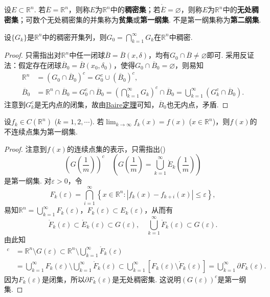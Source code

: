 \documentclass[../../main.tex]{subfiles}
\begin{document}
\begin{definition}
设$E\subset\mathbb{R}^n$. 若$\overline{E}=\mathbb{R}^n$，则称$E$为$\mathbb{R}^n$中的\textbf{稠密集}；若$\mathring{\overline{E}}=\varnothing$，则称$E$为$\mathbb{R}^n$中的\textbf{无处稠密集}；可数个无处稠密集的并集称为\textbf{贫集}或\textbf{第一纲集}. 不是第一纲集称为\textbf{第二纲集}.
\end{definition}

\begin{example}\label{example:例14}
设$\{G_k\}$是$\mathbb{R}^n$中的稠密开集列，则$G_0 = \bigcap_{k = 1}^{\infty}G_k$在$\mathbb{R}^n$中稠密.
\end{example}
\begin{proof}
只需指出对$\mathbb{R}^n$中任一闭球$\overline{B}=\overline{B}(x,\delta)$，均有$G_0\cap\overline{B}\neq\varnothing$即可. 采用反证法：假定存在闭球$\overline{B}_0=\overline{B}(x_0,\delta_0)$，使得$G_0\cap\overline{B}_0=\varnothing$，则易知
\begin{align*}
\mathbb{R}^n&=(G_0\cap\overline{B}_0)^c = G_0^c\cup(\overline{B}_0)^c,\\
\overline{B}_0&=\mathbb{R}^n\cap\overline{B}_0 = G_0^c\cap\overline{B}_0=\left(\bigcap_{k = 1}^{\infty}G_k\right)^c\cap\overline{B}_0=\bigcup_{k = 1}^{\infty}(G_k^c\cap\overline{B}_0).
\end{align*}
注意到$G_k^c$是无内点的闭集，故由\hyperref[theorem:Baire定理]{Baire定理}可知，$\overline{B}_0$也无内点，矛盾.
\end{proof}

\begin{example}\label{example:例15}
设$f_k\in C(\mathbb{R}^n)$ ($k = 1,2,\cdots$). 若$\lim_{k\to\infty}f_k(x)=f(x)$ ($x\in\mathbb{R}^n$)，则$f(x)$的不连续点集为第一纲集.
\end{example}
\begin{proof}
注意到$f(x)$的连续点集的表示，只需指出()
\[
\left(G\left(\frac{1}{m}\right)\right)^c \quad \left(G\left(\frac{1}{m}\right)=\bigcup_{k = 1}^{\infty}\mathring{E}_k\left(\frac{1}{m}\right)\right)
\]
是第一纲集. 对$\varepsilon>0$，令
\[
F_k(\varepsilon)=\bigcap_{i = 1}^{\infty}\left\{x\in\mathbb{R}^n: |f_k(x)-f_{k + i}(x)|\leqslant\varepsilon\right\},
\]
易知$\mathbb{R}^n=\bigcup_{k = 1}^{\infty}F_k(\varepsilon)$，$F_k(\varepsilon)\subset E_k(\varepsilon)$，从而有
\[
\mathring{F}_k(\varepsilon)\subset\mathring{E}_k(\varepsilon)\subset G(\varepsilon), \quad \bigcup_{k = 1}^{\infty}\mathring{F}_k(\varepsilon)\subset G(\varepsilon).
\]
由此知
\begin{align*}
[G(\varepsilon)]^c&=\mathbb{R}^n\setminus G(\varepsilon)\subset\mathbb{R}^n\setminus\bigcup_{k = 1}^{\infty}\mathring{F}_k(\varepsilon)\\
&=\bigcup_{k = 1}^{\infty}F_k(\varepsilon)\setminus\bigcup_{k = 1}^{\infty}\mathring{F}_k(\varepsilon)\subset\bigcup_{k = 1}^{\infty}[F_k(\varepsilon)\setminus\mathring{F}_k(\varepsilon)]=\bigcup_{k = 1}^{\infty}\partial F_k(\varepsilon).
\end{align*}
因为$F_k(\varepsilon)$是闭集，所以$\partial F_k(\varepsilon)$是无处稠密集. 这说明$(G(\varepsilon))^c$是第一纲集. 
\end{proof}
\end{document}
